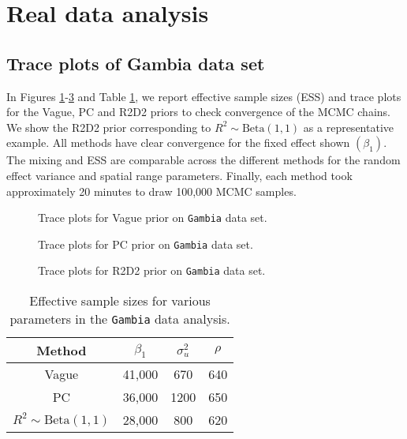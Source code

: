 \documentclass[12pt]{article}
\begin{document}
\section{Real data analysis}

\subsection{Trace plots of Gambia data set}
In Figures \ref{figA:vague}-\ref{figA:r2d2} and Table \ref{tab:ess}, we report effective sample sizes (ESS) and trace plots for the Vague, PC and R2D2 priors to check convergence of the MCMC chains. We show the R2D2 prior corresponding to $R^2\sim\mbox{Beta}(1,1)$ as a representative example. All methods have clear convergence for the fixed effect shown $(\beta_1)$. The mixing and ESS are comparable across the different methods for the random effect variance and spatial range parameters. Finally, each method took approximately 20 minutes to draw 100,000 MCMC samples.

\begin{figure}
\centering
{}
\caption{Trace plots for Vague prior on \texttt{Gambia} data set.}
\label{figA:vague}
\end{figure}

\begin{figure}
\centering
{}
\caption{Trace plots for PC prior on \texttt{Gambia} data set.}
\label{figA:pc}
\end{figure}

\begin{figure}
\centering
{}
\caption{Trace plots for R2D2 prior on \texttt{Gambia} data set.}
\label{figA:r2d2}
\end{figure}

\begin{table}[]
    \centering
    \begin{tabular}{c|ccc}
        Method & $\beta_1$ & $\sigma^2_u$ & $\rho$ \\\hline
        Vague & 41,000 & 670 & 640\\
        PC & 36,000 & 1200 & 650\\
        $R^2\sim\mbox{Beta}(1,1)$ & 28,000 & 800 & 620
    \end{tabular}
    \caption{Effective sample sizes for various parameters in the \texttt{Gambia} data analysis.}
    \label{tab:ess}
\end{table}
\end{document}
